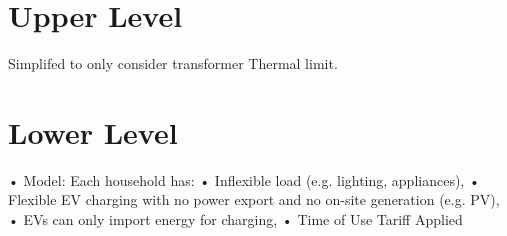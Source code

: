 \section{Upper Level}

Simplifed to only consider transformer Thermal limit.


\section{Lower Level}

•	Model: Each household has:
•	Inflexible load (e.g. lighting, appliances),
•	Flexible EV charging with no power export and no on-site generation (e.g. PV),
•	EVs can only import energy for charging,
•   Time of Use Tariff Applied

